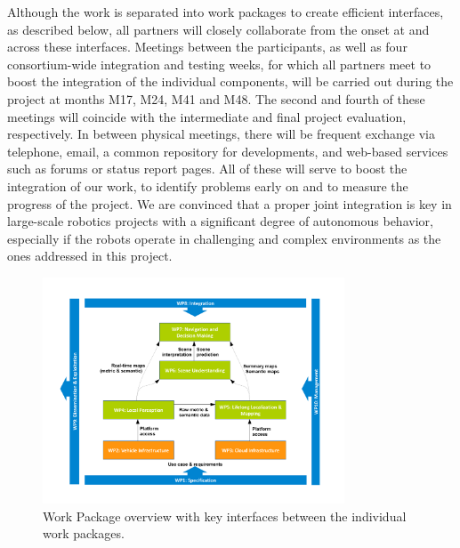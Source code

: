 Although the work is separated into work packages to create efficient interfaces, as described below, all partners will closely collaborate from the onset at and across these interfaces. Meetings between the participants, as well as four consortium-wide integration and testing weeks, for which all partners meet to boost the integration of the individual components, will be carried out during the project at months M17, M24, M41 and M48. The second and fourth of these meetings will coincide with the intermediate and final project evaluation, respectively. In between physical meetings, there will be frequent exchange via telephone, email, a common repository for developments, and web-based services such as forums or status report pages. All of these will serve to boost the integration of our work, to identify problems early on and to measure the progress of the project. We are convinced that a proper joint integration is key in large-scale robotics projects with a significant degree of autonomous behavior, especially if the robots operate in challenging and complex environments as the ones addressed in this project. 


\begin{figure}[ht]
  \centering
   \includegraphics[width=0.8\textwidth] {pics/wpOverviewV2.pdf}
   \caption{Work Package overview with key interfaces between the individual work packages.}
   \label{fig:wpOverview}
\end{figure}



